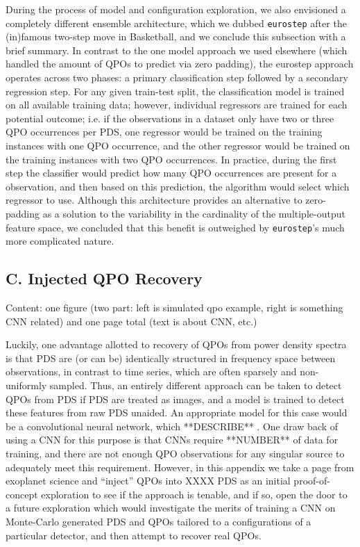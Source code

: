 \documentclass[fleqn,usenatbib]{mnras}
\begin{document}
During the process of model and configuration exploration, we also envisioned a completely different ensemble architecture, which we dubbed \texttt{eurostep} after the (in)famous two-step move in Basketball, and we conclude this subsection with a brief summary. In contrast to the one model approach we used elsewhere (which handled the amount of QPOs to predict via zero padding), the eurostep approach operates across two phases: a primary classification step followed by a secondary regression step. For any given train-test split, the classification model is trained on all available training data; however, individual regressors are trained for each potential outcome; i.e. if the observations in a dataset only have two or three QPO occurrences per PDS, one regressor would be trained on the training instances with one QPO occurrence, and the other regressor would be trained on the training instances with two QPO occurrences. In practice, during the first step the classifier would predict how many QPO occurrences are present for a observation, and then based on this prediction, the algorithm would select which regressor to use. Although this architecture provides an alternative to zero-padding as a solution to the variability in the cardinality of the multiple-output feature space, we concluded that this benefit is outweighed by \texttt{eurostep}'s much more complicated nature. 

\subsection*{C. Injected QPO Recovery}

Content: one figure (two part: left is simulated qpo example, right is something CNN related) and one page total (text is about CNN, etc.) 

Luckily, one advantage allotted to recovery of QPOs from power density spectra is that PDS are (or can be) identically structured in frequency space between observations, in contrast to time series, which are often sparsely and non-uniformly sampled. Thus, an entirely different approach can be taken to detect QPOs from PDS if PDS are treated as images, and a model is trained to detect these features from raw PDS unaided. An appropriate model for this case would be a convolutional neural network, which **DESCRIBE** . One draw back of using a CNN for this purpose is that CNNs require **NUMBER** of data for training, and there are not enough QPO observations for any singular source to adequately meet this requirement. However, in this appendix we take a page from exoplanet science and ``inject'' QPOs into XXXX PDS as an initial proof-of-concept exploration to see if the approach is tenable, and if so, open the door to a future exploration which would investigate the merits of training a CNN on Monte-Carlo generated PDS and QPOs tailored to a configurations of a particular detector, and then attempt to recover real QPOs.  
\end{document}
